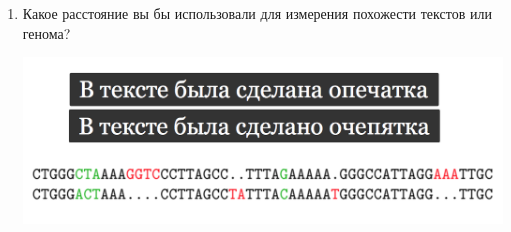 \documentclass[12pt, a4paper, oneside]{article}
\begin{document}
\begin{enumerate}
\item Какое расстояние вы бы использовали для измерения похожести текстов или генома?

\begin{center}
	\includegraphics[scale=0.3]{metr_3.png}
\end{center}

\end{enumerate}
\end{document}

